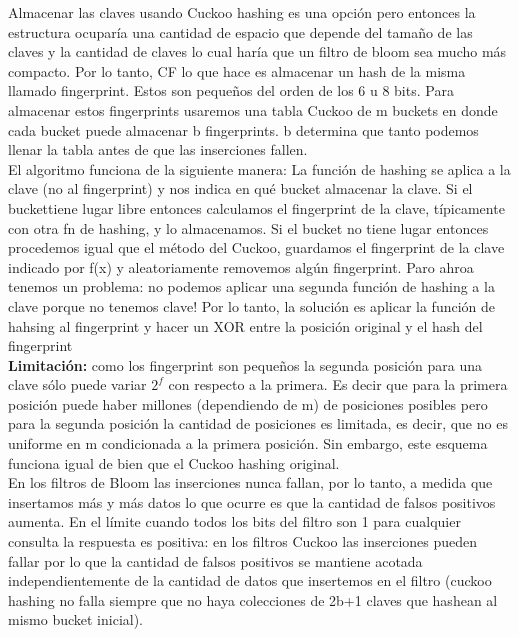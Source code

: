 \documentclass[titlepage,a4paper]{article}
\begin{document}
Almacenar las claves usando Cuckoo hashing es una opción pero entonces la estructura ocuparía una cantidad de espacio que depende del  tamaño de las claves y la cantidad de claves lo cual haría que un filtro de bloom sea mucho más compacto. Por lo tanto, CF lo que hace es almacenar un hash de la misma llamado fingerprint. Estos son pequeños del orden de los 6 u 8 bits.  Para almacenar estos fingerprints usaremos una tabla Cuckoo de m buckets en donde cada bucket puede almacenar b fingerprints. b determina que tanto podemos llenar la tabla antes de que las inserciones fallen. \\

El algoritmo funciona de la siguiente manera: La función de hashing se aplica a la clave (no al fingerprint) y nos indica en qué bucket almacenar la clave. Si el buckettiene lugar libre entonces calculamos el fingerprint de la clave, típicamente con otra fn de hashing, y lo almacenamos. Si el bucket no tiene lugar entonces procedemos igual que el método del Cuckoo, guardamos el fingerprint de la clave indicado por f(x) y aleatoriamente removemos algún fingerprint. Paro ahroa tenemos un problema: no podemos aplicar una segunda función de hashing a la clave porque no tenemos clave! Por lo tanto, la solución es aplicar la función de hahsing al fingerprint y hacer un XOR entre la posición original y el hash del fingerprint\\

\textbf{Limitación:} como los fingerprint son pequeños la segunda posición para una clave sólo puede variar $2^f$ con respecto a la primera. Es decir que para la primera posición puede haber millones (dependiendo de m) de posiciones posibles pero para la segunda posición la cantidad de posiciones es limitada, es decir, que no es uniforme en m condicionada a la primera posición. Sin embargo, este esquema funciona igual de bien que el Cuckoo hashing original. \\

En los filtros de Bloom las inserciones nunca fallan, por lo tanto, a medida que insertamos más y más datos lo que ocurre es que la cantidad de falsos positivos aumenta. En el límite cuando todos los bits del filtro son 1 para cualquier consulta la respuesta es positiva: en los filtros Cuckoo las inserciones pueden fallar por lo que la cantidad de falsos positivos se mantiene acotada independientemente de la cantidad de datos que insertemos en el filtro (cuckoo hashing no falla siempre que no haya colecciones de 2b+1 claves que hashean al mismo bucket inicial). \\
\end{document}
